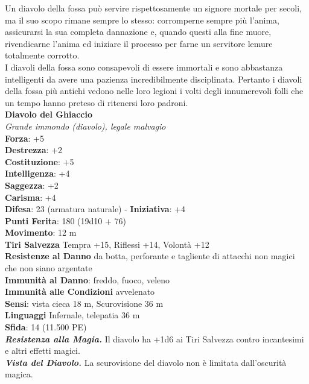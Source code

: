 \begin{multicols}{2}
Un diavolo della fossa può servire rispettosamente un signore mortale per secoli, ma il suo scopo rimane sempre lo stesso: corromperne sempre più l'anima, assicurarsi la sua completa dannazione e, quando questi alla fine muore, rivendicarne l'anima ed iniziare il processo per farne un servitore lemure totalmente corrotto.\\

I diavoli della fossa sono consapevoli di essere immortali e sono abbastanza intelligenti da avere una pazienza incredibilmente disciplinata. Pertanto i diavoli della fossa più antichi vedono nelle loro legioni i volti degli innumerevoli folli che un tempo hanno preteso di ritenersi loro padroni.\\

\medskip\textbf{Diavolo del Ghiaccio}\\
\emph{Grande immondo (diavolo), legale malvagio}\\
\textbf{Forza}: +5\\
\textbf{Destrezza}: +2\\
\textbf{Costituzione}: +5\\
\textbf{Intelligenza}: +4\\
\textbf{Saggezza}: +2\\
\textbf{Carisma}: +4\\
\textbf{Difesa}: 23 (armatura naturale) - \textbf{Iniziativa}: +4\\
\textbf{Punti Ferita}: 180 (19d10 + 76)\\
\textbf{Movimento}: 12 m\\
\textbf{Tiri Salvezza} Tempra +15, Riflessi +14, Volontà +12\\
\textbf{Resistenze al Danno} da botta, perforante e tagliente di attacchi non magici che non siano argentate\\
\textbf{Immunità al Danno}: freddo, fuoco, veleno\\
\textbf{Immunità alle Condizioni} avvelenato\\
\textbf{Sensi}: vista cieca 18 m, Scurovisione 36 m\\
\textbf{Linguaggi} Infernale, telepatia 36 m \\
\textbf{Sfida}: 14 (11.500 PE)\smallskip\\
\emph{\textbf{Resistenza alla Magia.}} Il diavolo ha +1d6 ai Tiri Salvezza contro incantesimi e altri effetti magici.\\
\emph{\textbf{Vista del Diavolo.}} La scurovisione del diavolo non è limitata dall'oscurità magica.\\

\end{multicols}
